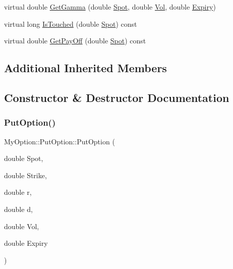 \begin{DoxyCompactItemize}
virtual double \hyperlink{classMyOption_1_1PutOption_aaca54c52498c8809c84d4c6800827526}{Get\+Gamma} (double \hyperlink{classMyOption_1_1Option_a6c6f01d75cde7e92d16a6d8d6f331a1d}{Spot}, double \hyperlink{classMyOption_1_1Option_a5d6002c14b335c782873bf1437113513}{Vol}, double \hyperlink{classMyOption_1_1Option_ac1adacb417fede41d151b9cda05bcb3d}{Expiry})
\item 
virtual long \hyperlink{classMyOption_1_1PutOption_a35f98855719f9920fa8176deb6bfd75b}{Is\+Touched} (double \hyperlink{classMyOption_1_1Option_a6c6f01d75cde7e92d16a6d8d6f331a1d}{Spot}) const
\item 
virtual double \hyperlink{classMyOption_1_1PutOption_a5f1609850308f1770d9ad6051ec55f12}{Get\+Pay\+Off} (double \hyperlink{classMyOption_1_1Option_a6c6f01d75cde7e92d16a6d8d6f331a1d}{Spot}) const
\end{DoxyCompactItemize}
\subsection*{Additional Inherited Members}


\subsection{Constructor \& Destructor Documentation}
\hypertarget{classMyOption_1_1PutOption_ab8da30b5590d3871c443718c0d32ef4e}{}\label{classMyOption_1_1PutOption_ab8da30b5590d3871c443718c0d32ef4e} 
\subsubsection{\texorpdfstring{Put\+Option()}{PutOption()}}
{\footnotesize\ttfamily My\+Option\+::\+Put\+Option\+::\+Put\+Option (\begin{DoxyParamCaption}\item[{double}]{Spot,  }\item[{double}]{Strike,  }\item[{double}]{r,  }\item[{double}]{d,  }\item[{double}]{Vol,  }\item[{double}]{Expiry }\end{DoxyParamCaption})}

\hypertarget{classMyOption_1_1PutOption_adeb4763024d3c2de9d77fb524f782667}{}\label{classMyOption_1_1PutOption_adeb4763024d3c2de9d77fb524f782667} 
